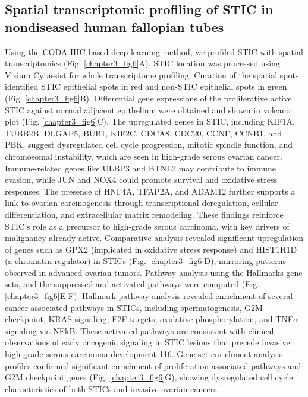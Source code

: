 \begin{refsection}
    \subsection{Spatial transcriptomic profiling of STIC in nondiseased human fallopian tubes}
    Using the CODA IHC-based deep learning method, we profiled STIC with spatial transcriptomics (Fig. \ref{chapter3_fig6}A). STIC location was processed using Visium Cytassist for whole transcriptome profiling. Curation of the spatial spots identified STIC epithelial spots in red and non-STIC epithelial spots in green (Fig. \ref{chapter3_fig6}B).
    Differential gene expressions of the proliferative active STIC against normal adjacent epithelium were obtained and shown in volcano plot (Fig. \ref{chapter3_fig6}C). The upregulated genes in STIC, including KIF1A, TUBB2B, DLGAP5, BUB1, KIF2C, CDCA8, CDC20, CCNF, CCNB1, and PBK, suggest dysregulated cell cycle progression, mitotic spindle function, and chromosomal instability, which are seen in high-grade serous ovarian cancer\cite{Zhang2021Knockdown,Schneider2017AURKA,Hosea2024two,Chong2018Deregulation,Moura2014High,Yang2022CCNB1,Chen2025Tumor,Ikeda2016T,Comisso2017OCT4,Tang2021Pan,Fu2020Computational}.  Immune-related genes like ULBP3 and BTNL2 may contribute to immune evasion, while JUN and NOX4 could promote survival and oxidative stress responses\cite{Sun2025NOX4,Du2022Cancer,McGilvray2010ULBP2,Wang1999Microtubule}. The presence of HNF4A, TFAP2A, and ADAM12 further supports a link to ovarian carcinogenesis through transcriptional deregulation, cellular differentiation, and extracellular matrix remodeling\cite{Mai2021Histone,Du2015Screening,Cheon2015ADAM12}. These findings reinforce STIC’s role as a precursor to high-grade serous carcinoma, with key drivers of malignancy already active\cite{Schweizer2025Spatial}. Comparative analysis revealed significant upregulation of genes such as GPX2 (implicated in oxidative stress response) and HIST1H1D (a chromatin regulator) in STICs (Fig. \ref{chapter3_fig6}D), mirroring patterns observed in advanced ovarian tumors\cite{Wang2019GPX2,Parssinen2008Identification}.
    Pathway analysis using the Hallmarks gene sets\cite{Liberzon2015Molecular}, and the suppressed and activated pathways were computed (Fig. \ref{chapter3_fig6}E-F). Hallmark pathway analysis revealed enrichment of several cancer-associated pathways in STICs, including spermatogenesis, G2M checkpoint, KRAS signaling, E2F targets, oxidative phosphorylation, and TNF$\alpha$ signaling via NFkB\cite{Chang2025Integrated,Rohozinski2009Spermatogenesis,Ouyang2009Genistein,Hendrikse2023potential,Zhan2016E2F1,Nayak2018Oxidative,Maccio2012Inflammation, Harrington2019NF}. These activated pathways are consistent with clinical observations of early oncogenic signaling in STIC lesions that precede invasive high-grade serous carcinoma development\cite{Weigert2025cell} 116. Gene set enrichment analysis profiles confirmed significant enrichment of proliferation-associated pathways and G2M checkpoint genes (Fig. \ref{chapter3_fig6}G), showing dysregulated cell cycle characteristics of both STICs and invasive ovarian cancers.

\end{refsection}
